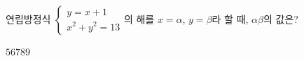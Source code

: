 연립방정식 $\begin{cases} y=x+1 \\ x^2+y^2=13 \end{cases}$의 해를 $x=\alpha$, $y=\beta$라 할 때, $\alpha\beta$의 값은?
\begin{choices32}{$5$}{$6$}{$7$}{$8$}{$9$}\end{choices32}
